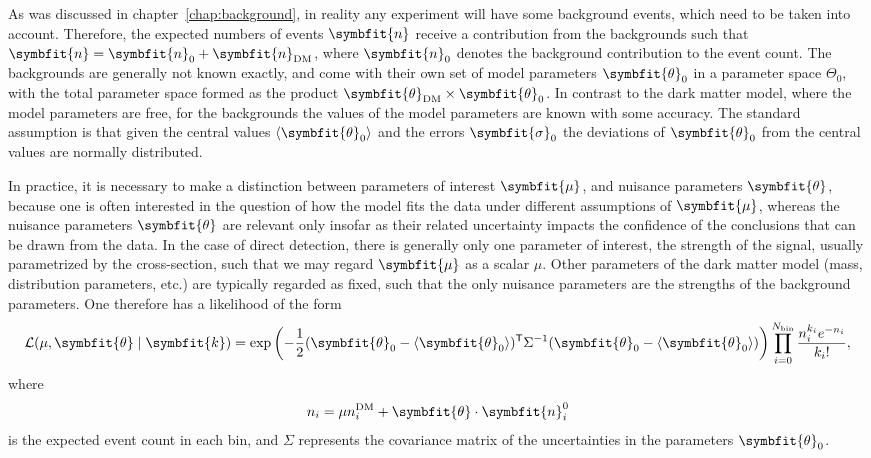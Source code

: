 \documentclass[b5paper, 10pt, twoside]{book}
\renewcommand{\vec}[1]{\symbfit{#1}}
\newcommand{\tmean}[1]{\langle#1\rangle}
\newcommand{\transp}{\mathsf{T}}
\begin{document}
As was discussed in chapter~\ref{chap:background}, in reality any experiment will have some background events, which need to be taken into account. Therefore, the expected numbers of events $\vec{n}$ receive a contribution from the backgrounds such that $\vec{n}=\vec{n}_\text{0}+\vec{n}_\text{DM}$, where $\vec{n}_\text{0}$ denotes the background contribution to the event count. The backgrounds are generally not known exactly, and come with their own set of model parameters $\vec{\theta}_0$ in a parameter space $\Theta_0$, with the total parameter space formed as the product $\vec{\theta}_\text{DM}\times\vec{\theta}_0$. In contrast to the dark matter model, where the model parameters are free, for the backgrounds the values of the model parameters are known with some accuracy. The standard assumption is that given the central values $\tmean{\vec{\theta}_0}$ and the errors $\vec{\sigma}_0$ the deviations of $\vec{\theta}_0$ from the central values are normally distributed.

In practice, it is necessary to make a distinction between parameters of interest $\vec{\mu}$, and nuisance parameters $\vec{\theta}$, because one is often interested in the question of how the model fits the data under different assumptions of $\vec{\mu}$, whereas the nuisance parameters $\vec{\theta}$ are relevant only insofar as their related uncertainty impacts the confidence of the conclusions that can be drawn from the data. In the case of direct detection, there is generally only one parameter of interest, the strength of the signal, usually parametrized by the cross-section, such that we may regard $\vec{\mu}$ as a scalar $\mu$. Other parameters of the dark matter model (mass, distribution parameters, etc.) are typically regarded as fixed, such that the only nuisance parameters are the strengths of the background parameters. One therefore has a likelihood of the form
\begin{equation}
    \mathcal{L}(\mu,\vec{\theta}\mid\vec{k})=\exp\left(-\frac{1}{2}(\vec{\theta}_0-\tmean{\vec{\theta}_0})^\transp\Sigma^{-1}(\vec{\theta}_0-\tmean{\vec{\theta}_0})\right)\prod_{i=0}^{N_\text{bin}}\frac{n_i^{k_i}e^{-n_i}}{{k_i}!},
    \label{eq:likelihood}
\end{equation}
where
\begin{equation}
    n_i=\mu n_i^\text{DM}+\vec{\theta}\cdot\vec{n}_i^0
\end{equation}
is the expected event count in each bin, and $\Sigma$ represents the covariance matrix of the uncertainties in the parameters $\vec{\theta}_0$.
\end{document}
